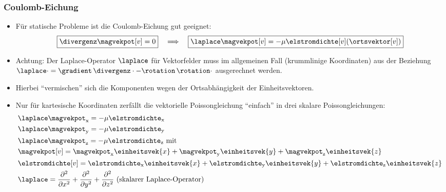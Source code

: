 \begin{frame}
  \frametitle{Coulomb-Eichung}
  \begin{itemize}[<+->]
  \item Für statische Probleme ist die \alert{Coulomb-Eichung} gut geeignet:
    $$
    \boxed{\divergenz\magvekpot[v] = 0} \quad \Longrightarrow \quad \boxed{\laplace \magvekpot[v]= -\mu \elstromdichte[v](\ortsvektor[v])}
    $$
  \item \alert{Achtung:} Der Laplace-Operator $\laplace$ für Vektorfelder muss im allgemeinen Fall (krummlinige Koordinaten) aus der Beziehung $\laplace \cdot = \gradient \, \divergenz \cdot - \rotation \, \rotation \cdot$ ausgerechnet werden.
  \item Hierbei \enquote{vermischen} sich die Komponenten wegen der Ortsabhängigkeit der Einheitsvektoren.
  \item \alert{Nur für kartesische Koordinaten} zerfällt die vektorielle Poissongleichung \enquote{einfach} in drei skalare Poissongleichungen:
    \begin{align*}
	& \laplace \magvekpot_\mathrm{x} = -\mu  \elstromdichte_\mathrm{x}\\
	& \laplace \magvekpot_\mathrm{y} = -\mu  \elstromdichte_\mathrm{y}\\
	& \laplace \magvekpot_\mathrm{z} = -\mu  \elstromdichte_\mathrm{z} \text{ mit} \\
	& \magvekpot[v] = \magvekpot_\mathrm{x}  \einheitsvek{x} + \magvekpot_\mathrm{y}  \einheitsvek{y} + \magvekpot_\mathrm{z}  \einheitsvek{z}\\
	& \elstromdichte[v] = \elstromdichte_\mathrm{x}  \einheitsvek{x} + \elstromdichte_\mathrm{y}  \einheitsvek{y} + \elstromdichte_\mathrm{z}  \einheitsvek{z} \\
  &\laplace = \dfrac{\partial^2}{\partial x^2} + \dfrac{\partial^2}{\partial y^2} + \dfrac{\partial^2}{\partial z^2} \text{ (skalarer Laplace-Operator)}
\end{align*}

  \end{itemize}
\end{frame}


